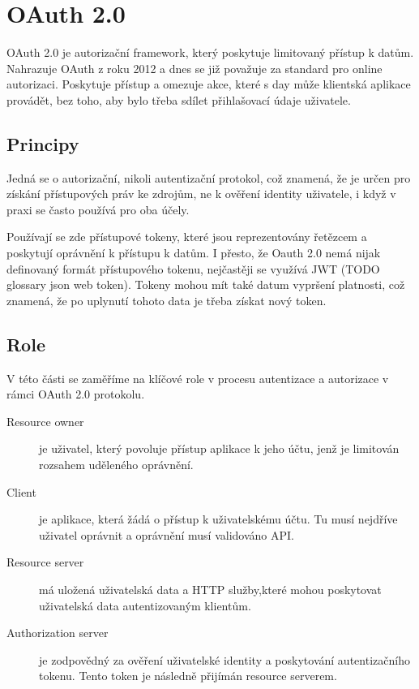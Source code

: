 \section{OAuth 2.0}
OAuth 2.0 je autorizační framework, který poskytuje limitovaný přístup k datům. Nahrazuje OAuth z roku 2012 a dnes se již považuje za standard pro online autorizaci. Poskytuje přístup a omezuje akce, které s day může klientská aplikace provádět, bez toho, aby bylo třeba sdílet přihlašovací údaje uživatele.


\subsection{Principy}
Jedná se o autorizační, nikoli autentizační protokol, což znamená, že je určen pro získání přístupových práv ke zdrojům, ne k ověření identity uživatele, i když v praxi se často používá pro oba účely.

Používají se zde přístupové tokeny, které jsou reprezentovány řetězcem a poskytují oprávnění k přístupu k datům. I přesto, že Oauth 2.0 nemá nijak definovaný formát přístupového tokenu, nejčastěji se využívá JWT (TODO glossary json web token). Tokeny mohou mít také datum vypršení platnosti, což znamená, že po uplynutí tohoto data je třeba získat nový token.


\subsection{Role}\label{sec:Oauth_roles}
V této části se zaměříme na klíčové role v procesu autentizace a autorizace v rámci OAuth 2.0 protokolu.

\begin{description}
    \item[Resource owner] je uživatel, který povoluje přístup aplikace k jeho účtu, jenž je limitován rozsahem uděleného oprávnění.
    \item[Client] je aplikace, která žádá o přístup k uživatelskému účtu. Tu musí nejdříve uživatel oprávnit a oprávnění musí validováno API.
    \item[Resource server] má uložená uživatelská data a HTTP služby,které mohou poskytovat uživatelská data autentizovaným klientům.
    \item[Authorization server] je zodpovědný za ověření uživatelské identity a poskytování autentizačního tokenu. Tento token je následně přijímán resource serverem.
\end{description}


